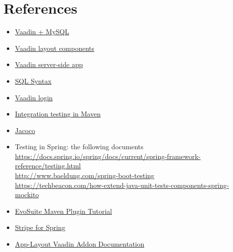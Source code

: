 \documentclass{article}
\begin{document}
	\section{References}
\begin{itemize}
\item{}\href{https://vaadin.com/blog/building-a-web-ui-for-mysql-databases-in-plain-java-?utm_campaign=New%20registration&utm_source=hs_automation&utm_medium=email&utm_content=39610603&_hsenc=p2ANqtz--ut22Rfm32KlobpIHtq6LpH3COcrPL4sZEWDAXO1ZoRH34i0P46KUYGkVxwFIw49_cBYJPSgFVZ82j3sQ5lAAvDc8h-g&_hsmi=39610603}{Vaadin + MySQL}
\item{}\href{https://vaadin.com/docs/v8/framework/layout/layout-overview.html}{Vaadin layout components}
\item{}\href{https://vaadin.com/docs/v8/framework/application/application-overview.html}{Vaadin server-side app}
\item{}\href{https://www.w3schools.com/sql/default.asp}{SQL Syntax}
\item{}\href{https://examples.javacodegeeks.com/enterprise-java/vaadin/vaadin-login-example/}{Vaadin login}
\item{}\href{https://www.petrikainulainen.net/programming/maven/integration-testing-with-maven/}{Integration testing in Maven}
\item{}\href{https://www.petrikainulainen.net/programming/maven/creating-code-coverage-reports-for-unit-and-integration-tests-with-the-jacoco-maven-plugin/}{Jacoco}
\item{}Testing in Spring: the following documents
\\ 	\href{https://docs.spring.io/spring/docs/current/spring-framework-reference/testing.html}{https://docs.spring.io/spring/docs/current/spring-framework-reference/testing.html}
\\ 	\href{http://www.baeldung.com/spring-boot-testing}{http://www.baeldung.com/spring-boot-testing}
\\ 	\href{https://techbeacon.com/how-extend-java-unit-tests-components-spring-mockito}{https://techbeacon.com/how-extend-java-unit-tests-components-spring-mockito}
\item{}\href{http://www.evosuite.org/documentation/maven-plugin/}{EvoSuite Maven Plugin Tutorial}
\item{}\href{http://www.baeldung.com/java-stripe-api}{Stripe for Spring}
\item{}\href{https://vaadin.com/directory/component/app-layout-add-on}{App-Layout Vaadin Addon Documentation}
\end{itemize}			
\newpage
\end{document}
